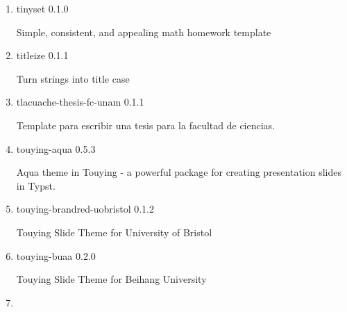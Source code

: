 \begin{enumerate}
  { thesist } { 0.2.0 }

  A Master\textquotesingle s thesis template for Instituto Superior
  TÃ©cnico (IST)
\item
  \href{/universe/package/tinyset/}{}

  { tinyset } { 0.1.0 }

  Simple, consistent, and appealing math homework template
\item
  \href{/universe/package/titleize/}{}

  { titleize } { 0.1.1 }

  Turn strings into title case
\item
  \href{/universe/package/tlacuache-thesis-fc-unam/}{}


  { tlacuache-thesis-fc-unam } { 0.1.1 }

  Template para escribir una tesis para la facultad de ciencias.
\item
  \href{/universe/package/touying-aqua/}{}


  { touying-aqua } { 0.5.3 }

  Aqua theme in Touying - a powerful package for creating presentation
  slides in Typst.
\item
  \href{/universe/package/touying-brandred-uobristol/}{}


  { touying-brandred-uobristol } { 0.1.2 }

  Touying Slide Theme for University of Bristol
\item
  \href{/universe/package/touying-buaa/}{}


  { touying-buaa } { 0.2.0 }

  Touying Slide Theme for Beihang University
\item
  \href{/universe/package/touying-flow/}{}



\end{enumerate}
